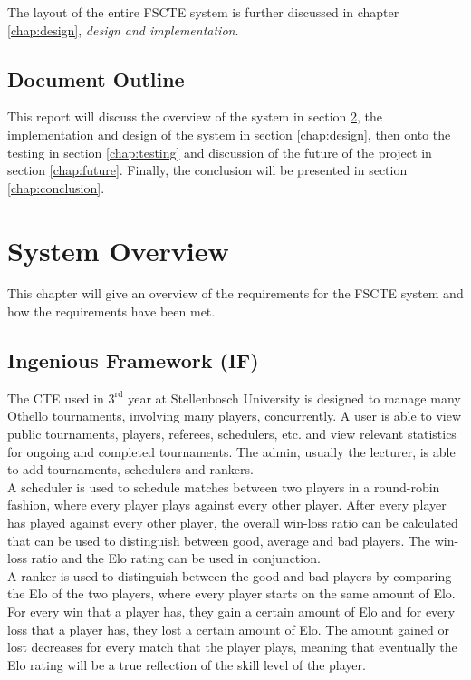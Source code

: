 \documentclass[a4paper, 12pt]{report}
\begin{document}
The layout of the entire FSCTE system is further discussed in chapter
\ref{chap:design}, \emph{design and implementation}.

\section{Document Outline}

This report will discuss the overview of the system in section \ref{chap:overview},
the implementation and design of the system in section \ref{chap:design}, then
onto the testing in section \ref{chap:testing} and discussion of the future of
the project in section \ref{chap:future}. Finally, the conclusion will be
presented in section \ref{chap:conclusion}.

\chapter{System Overview}
\label{chap:overview}

This chapter will give an overview of the requirements for the FSCTE system and
how the requirements have been met.

\section{Ingenious Framework (IF)}

The CTE used in $3^{\text{rd}}$ year at Stellenbosch
University is \mbox{designed} to manage many Othello \cite{othello} tournaments,
involving many players, concurrently. A user is able to view public tournaments,
players, referees, schedulers, etc. and view \mbox{relevant} statistics for
ongoing and completed tournaments. The admin, usually the \mbox{lecturer}, is
able to add tournaments, schedulers and rankers. \\

A scheduler is used to schedule matches between two players in a round-robin
\mbox{fashion}, where every player plays against every other player. After every player
has played against every other player, the overall win-loss ratio can be calculated
that can be used to \mbox{distinguish} between good, average and bad players. The
win-loss ratio and the Elo rating \cite{elo} can be used in conjunction. \\

A ranker is used to distinguish between the good and bad players by comparing
the Elo of the two players, where every player starts on the same amount of Elo.
For every win that a player has, they gain a certain amount of Elo and for every
loss that a player has, they lost a certain amount of Elo. The amount gained or
lost decreases for every match that the player plays, meaning that eventually
the Elo rating will be a true reflection of the skill level of the player. \\
\end{document}
